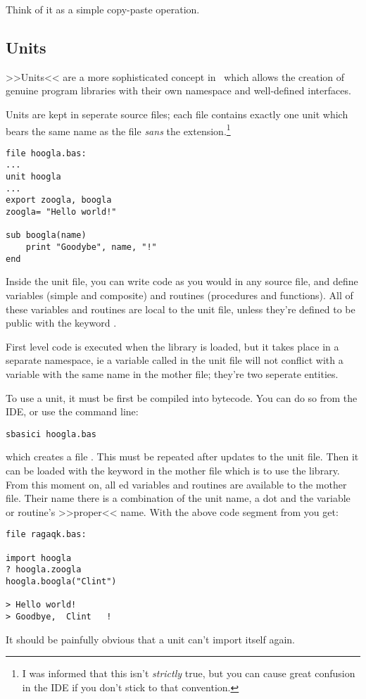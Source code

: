 Think of it as a simple copy-paste operation.

\subsection{Units}

>>Units<< are a more sophisticated concept in \SB\ which allows the creation
of genuine program libraries with their own namespace and well-defined
interfaces.

Units are kept in seperate source files; each file contains exactly one
unit which bears the same name as the file \emph{sans} the 
extension.\footnote{I was informed that this isn't \emph{strictly} true,
but you can cause great confusion in the IDE if you don't stick to that
convention.}

\begin{lstlisting}
file hoogla.bas:
...
unit hoogla
...
export zoogla, boogla
zoogla= "Hello world!"

sub boogla(name)
	print "Goodybe", name, "!"
end
\end{lstlisting}

Inside the unit file, you can write code as you would in any source
file, and define variables (simple and composite) and routines
(procedures and functions). All of these variables and routines are
local to the unit file, unless they're defined to be public with the
keyword .

First level code is executed when the library is loaded, but it takes
place in a separate namespace, ie a variable called  in the
unit file will not conflict with a variable with the same name in the
mother file; they're two seperate entities.

To use a unit, it must be first be compiled into bytecode. You can do so
from the IDE, or use the command line:

\begin{lstlisting}
sbasici hoogla.bas
\end{lstlisting}

which creates a file . This must be repeated after
updates to the unit file. Then it can be loaded with the keyword
 in the mother file which is to use the library. From
this moment on, all ed variables and routines are available
to the mother file. Their name there is a combination of the unit name,
a dot  and the variable or routine's >>proper<< name. With the
above code segment from  you get:

\begin{lstlisting}
file ragaqk.bas:

import hoogla
? hoogla.zoogla
hoogla.boogla("Clint")

> Hello world!
> Goodbye,	Clint	!
\end{lstlisting}

It should be painfully obvious that a unit can't import itself again.
